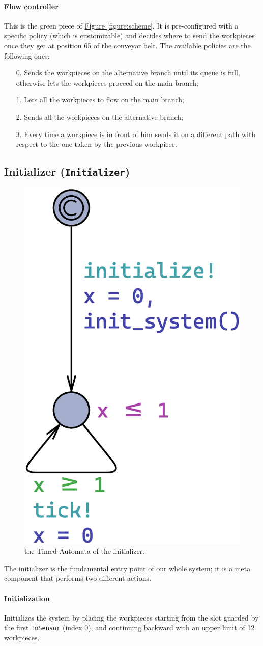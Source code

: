 \documentclass[a4paper]{article}
\newcommand{\figureref}[1]{\textsf{\hyperref[#1]{Figure \ref*{#1}}}}
\begin{document}
    \paragraph{Flow controller} This is the green piece of \figureref{figure:scheme}. It is pre-configured with a specific policy (which is customizable) and decides where to send the workpieces once they get at position 65 of the conveyor belt. The available policies are the following ones:
    \begin{enumerate}
        \item[0.] Sends the workpieces on the alternative branch until its queue is full, otherwise lets the workpieces proceed on the main branch;
        \item[1.] Lets all the workpieces to flow on the main branch;
        \item[2.] Sends all the workpieces on the alternative branch;
        \item[3.] Every time a workpiece is in front of him sends it on a different path with respect to the one taken by the previous workpiece.
    \end{enumerate}

    \subsection{Initializer (\texttt{Initializer})}

    \begin{figure}[h!]
        \centering
        \includegraphics[width=0.12\columnwidth]{./images/automata/initializer}
        \caption{the Timed Automata of the initializer.}
    \end{figure}

    The initializer is the fundamental entry point of our whole system; it is a meta component that performs two different actions.

    \paragraph{Initialization} Initializes the system by placing the workpieces starting from the slot guarded by the first \texttt{InSensor} (index 0), and continuing backward with an upper limit of 12 workpieces.
\end{document}
